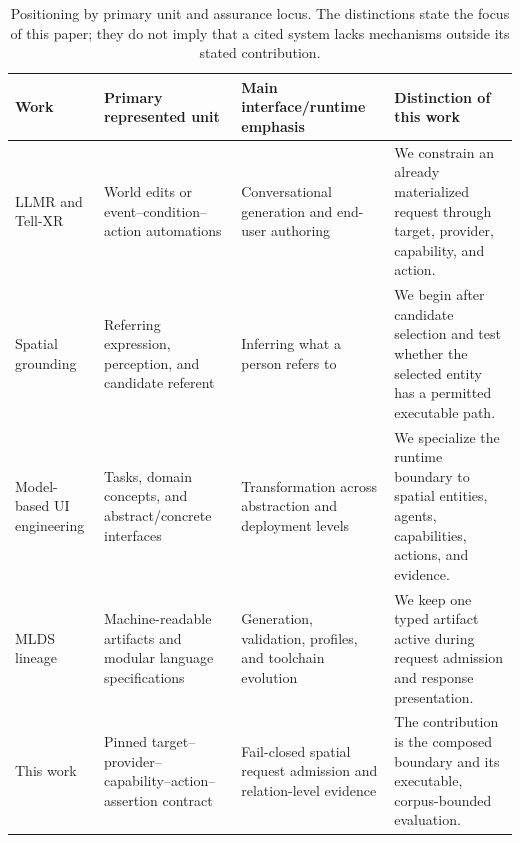 \begin{table}[t]
  \caption{Positioning by primary unit and assurance locus.  The distinctions
  state the focus of this paper; they do not imply that a cited system lacks
  mechanisms outside its stated contribution.}
  \label{tab:positioning}
  \small
  \begin{tabularx}{\textwidth}{@{}p{27mm}Y Y Y@{}}
    \toprule
    Work & Primary represented unit & Main interface/runtime emphasis &
    Distinction of this work \\
    \midrule
    LLMR \cite{delatorre2024llmr} and Tell-XR
    \cite{carcangiu2025tellxr}
      & World edits or event--condition--action automations
      & Conversational generation and end-user authoring
      & We constrain an already materialized request through target, provider,
        capability, and action. \\
    Spatial grounding \cite{gorniak2005grounding,lemaignan2012grounding}
      & Referring expression, perception, and candidate referent
      & Inferring what a person refers to
      & We begin after candidate selection and test whether the selected entity
        has a permitted executable path. \\
    Model-based UI engineering
    \cite{puerta1999framework,calvary2003cameleon,paterno2009maria}
      & Tasks, domain concepts, and abstract/concrete interfaces
      & Transformation across abstraction and deployment levels
      & We specialize the runtime boundary to spatial entities, agents,
        capabilities, actions, and evidence. \\
    MLDS lineage
    \cite{fischer2025machinereadable,burk2026modular}
      & Machine-readable artifacts and modular language specifications
      & Generation, validation, profiles, and toolchain evolution
      & We keep one typed artifact active during request admission and response
        presentation. \\
    This work
      & Pinned target--provider--capability--action--assertion contract
      & Fail-closed spatial request admission and relation-level evidence
      & The contribution is the composed boundary and its executable,
        corpus-bounded evaluation. \\
    \bottomrule
  \end{tabularx}
\end{table}
